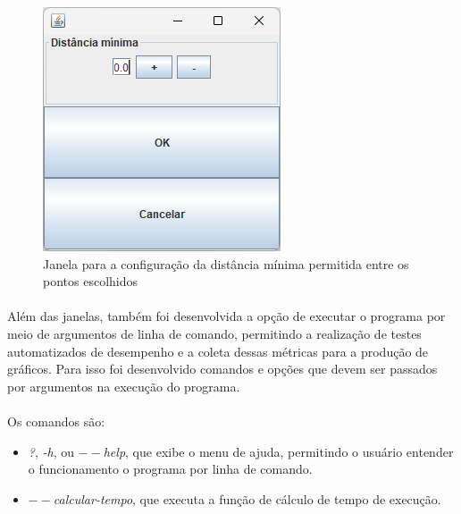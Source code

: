 \documentclass[12pt]{article}
\begin{document}
\begin{figure}[H]
    \centering
    \includegraphics[width=\textwidth]{Captura de tela 2024-06-01 111132}
    \caption{Janela para a configuração da distância mínima permitida entre os pontos escolhidos}
    \label{fig:fig-8}
\end{figure}

\paragraph{}Além das janelas, também foi desenvolvida a opção de executar o programa por meio de argumentos de linha de comando, permitindo a realização de testes automatizados de desempenho e a coleta dessas métricas para a produção de gráficos. Para isso foi desenvolvido comandos e opções que devem ser passados por argumentos na execução do programa.

\paragraph{}Os comandos são: 

\begin{itemize}
    \item \textit{?}, \textit{-h}, ou \textit{$--$help}, que exibe o menu de ajuda, permitindo o usuário entender o funcionamento o programa por linha de comando.
    \item \textit{$--$calcular-tempo}, que executa a função de cálculo de tempo de execução.
\end{itemize}
\end{document}

